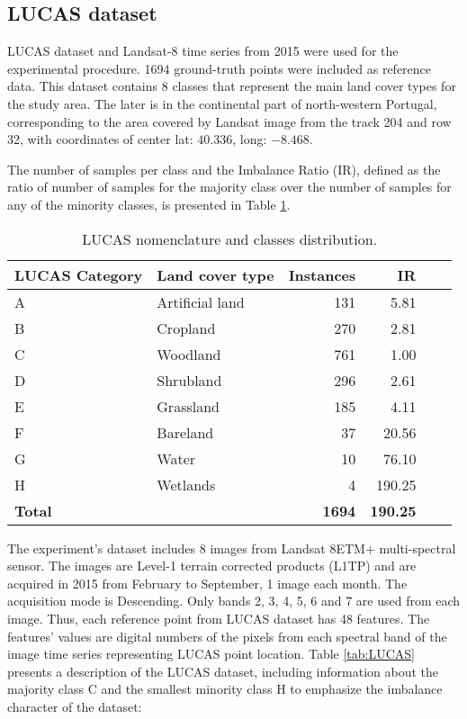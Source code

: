 \documentclass[remotesensing,article,submit,moreauthors,pdftex]{Definitions/mdpi}
\begin{document}
\subsection{LUCAS dataset}

LUCAS dataset and Landsat-8 time series from 2015 were used for the experimental
procedure. 1694 ground-truth points were included as reference data. This
dataset contains 8 classes that represent the main land cover types for the
study area. The later is in the continental part of north-western Portugal,
corresponding to the area covered by Landsat image from the track 204 and row
32, with coordinates of center lat: \( 40.336 \), long: \( -8.468 \).

The number of samples per class and the Imbalance Ratio (IR), defined as the ratio of
number of samples for the majority class over the number of samples for any of
the minority classes, is presented in Table \ref{tab:classes_distribution}.

\begin{table}[H]
	\centering
	\begin{tabular}{llrrrr}
		\toprule
		\textbf{LUCAS Category} & \textbf{Land cover type} & \textbf{Instances}
		& \textbf{IR} \\
		\hline
		A & Artificial land & 131 & 5.81 \\
		B & Cropland        & 270 & 2.81 \\
		C & Woodland        & 761 & 1.00 \\
		D & Shrubland       & 296 & 2.61 \\
		E & Grassland       & 185 & 4.11 \\
		F & Bareland        & 37  & 20.56 \\
		G & Water           & 10  & 76.10 \\
		H & Wetlands        & 4   & 190.25\\
		\hline
		\textbf{Total} & & \textbf{1694} &  \textbf{190.25} \\
		\bottomrule
	\end{tabular}
	\caption{\label{tab:classes_distribution}LUCAS nomenclature and classes distribution.}
\end{table}

The experiment's dataset includes 8 images from Landsat 8ETM+ multi-spectral
sensor. The images are Level-1 terrain corrected products (L1TP) and are
acquired in 2015 from February to September, 1 image each month. The acquisition
mode is Descending. Only bands 2, 3, 4, 5, 6 and 7 are used from each image.
Thus, each reference point from LUCAS dataset has 48 features. The features'
values are digital numbers of the pixels from each spectral band of the image
time series representing LUCAS point location. Table \ref{tab:LUCAS} presents a
description of the LUCAS dataset, including information about the majority class
C and the smallest minority class H to emphasize the imbalance character of the
dataset:
\end{document}
